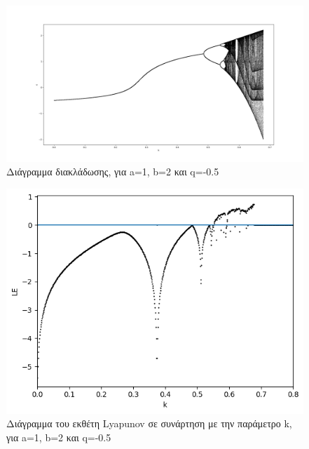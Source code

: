 \begin{figure}[h!]
	\centering
	\includegraphics[width=0.8\linewidth]{LateX images/graphs q05/g1}
	\caption{ Διάγραμμα διακλάδωσης, για a=1, b=2 και q=-0.5}
	\label{f:g10}
\end{figure}

\begin{figure}[h!]
	\centering
	\includegraphics[width=0.6\linewidth]{LateX images/graphs q05/g2}
	\caption{ Διάγραμμα του εκθέτη Lyapunov σε συνάρτηση με την παράμετρο k, για a=1, b=2 και q=-0.5}
	\label{f:g11}
\end{figure}

